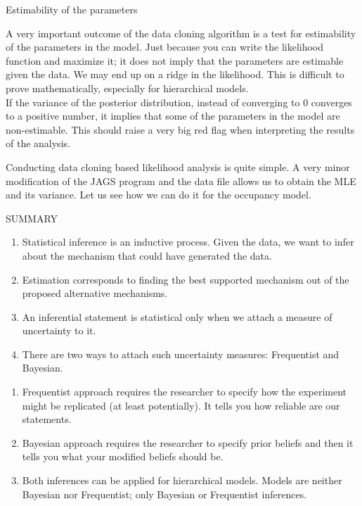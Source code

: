 \documentclass[10pt]{beamer}
\begin{document}
\begin{frame}
\begin{center}
\alert {Estimability of the parameters}
\end{center}
A very important outcome of the data cloning algorithm is a test for estimability of the parameters in the model. Just because you can write the likelihood function and maximize it; it does not imply that the parameters are estimable given the data. We may end up on a ridge in the likelihood. This is difficult to prove mathematically, especially for hierarchical models.\\
\pause
If the variance of the posterior distribution, instead of converging to 0 converges to a positive number, it implies that some of the parameters in the model are non-estimable. This should raise a very big red flag when interpreting the results of the analysis. 
\end{frame}

\begin{frame}
Conducting data cloning based likelihood analysis is quite simple. A very minor modification of the JAGS program and the data file allows us to obtain the MLE and its variance. Let us see how we can do it for the occupancy model. 
\end{frame}

\begin{frame}
\begin{center}
\LARGE {SUMMARY}
\end{center}
\begin{enumerate}
\item Statistical inference is an inductive process. Given the data, we want to infer about the mechanism that could have generated the data.
\pause
\item Estimation corresponds to finding the best supported mechanism out of the proposed alternative mechanisms.
\pause
\item An inferential statement is \alert {statistical} only when we attach a measure of uncertainty to it.
\pause
\item There are two ways to attach such uncertainty measures: Frequentist and Bayesian.
\end{enumerate}
\end{frame}

\begin{frame}
\begin{enumerate}
\item Frequentist approach requires the researcher to specify how the experiment might be replicated (at least potentially). It tells you how reliable are our statements.
\pause
\item Bayesian approach requires the researcher to specify prior beliefs and then it tells you what your modified beliefs should be. 
\pause
\item Both inferences can be applied for hierarchical models. Models are neither Bayesian nor Frequentist; only Bayesian or Frequentist inferences.
\end{enumerate}
\end{frame}
\end{document}
